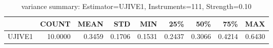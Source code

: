 \begin{table}[ht]
\centering
\caption{variance summary: Estimator=UJIVE1, Instruments=111, Strength=0.10}
\begin{tabular}{lrrrrrrrr}
\toprule
 & COUNT & MEAN & STD & MIN & 25\% & 50\% & 75\% & MAX \\
\midrule
UJIVE1 & 10.0000 & 0.3459 & 0.1706 & 0.1531 & 0.2437 & 0.3066 & 0.4214 & 0.6430 \\
\bottomrule
\end{tabular}
\end{table}

